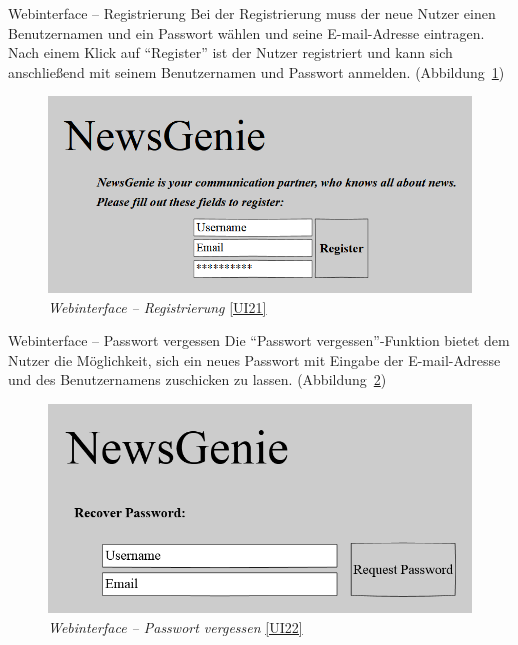 \pagebreak[3]

\begin{ui}{21}{Webinterface -- Registrierung}
Bei der Registrierung muss der neue Nutzer einen Benutzernamen und ein Passwort wählen und seine E-mail-Adresse eintragen. Nach einem Klick auf "`Register"' ist der Nutzer registriert und kann sich anschließend mit seinem Benutzernamen und Passwort anmelden. (Abbildung~\ref{fig:wi-reg})
\begin{figure}[ht]
\centering
\includegraphics[width=0.8\linewidth]{figures/webinterfaceRegister.png}
\caption{\textit{Webinterface -- Registrierung} \ref{UI21}}
\label{fig:wi-reg}
\end{figure}
\end{ui}

\begin{ui}{22}{Webinterface -- Passwort vergessen}
Die "`Passwort vergessen"'-Funktion bietet dem Nutzer die Möglichkeit, sich ein neues Passwort mit Eingabe der E-mail-Adresse und des Benutzernamens zuschicken zu lassen.
(Abbildung~\ref{fig:wi-recpw})
\begin{figure}[ht]
\centering
\includegraphics[width=0.8\linewidth]{figures/webinterfacePasswordRecover.png}
\caption{\textit{Webinterface -- Passwort vergessen} \ref{UI22}}
\label{fig:wi-recpw}
\end{figure}
\end{ui}

\pagebreak[4]

